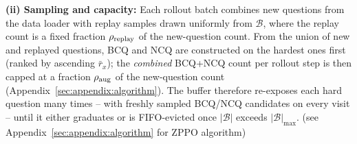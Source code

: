 \textbf{(ii) Sampling and capacity:}
Each rollout batch combines new questions from the data loader with replay samples drawn uniformly from $\mathcal{B}$, where the replay count is a fixed fraction $\rho_{\rm replay}$ of the new-question count. From the union of new and replayed questions, BCQ and NCQ are constructed on the hardest ones first (ranked by ascending $\bar{r}_x$); the \emph{combined} BCQ+NCQ count per rollout step is then capped at a fraction $\rho_{\rm aug}$ of the new-question count (Appendix~\ref{sec:appendix:algorithm}). The buffer therefore re-exposes each hard question many times -- with freshly sampled BCQ/NCQ candidates on every visit -- until it either graduates or is FIFO-evicted once $|\mathcal{B}|$ exceeds $|\mathcal{B}|_{\max}$. (see Appendix~\ref{sec:appendix:algorithm} for ZPPO algorithm)